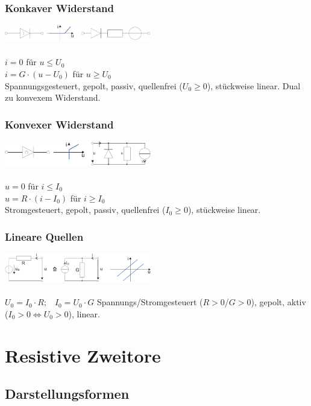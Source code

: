 \documentclass[a4paper,twocolumn,10pt]{article}
\begin{document}
\subsubsection*{Konkaver Widerstand}
\includegraphics[width=0.48\textwidth]{img/Rkonkav}\\\\
$i=0$ für $u\leq U_0$\\
$i=G\cdot (u-U_0)$ für $u\geq U_0$\\
Spannungsgesteuert, gepolt, passiv, quellenfrei ($U_0\ge 0$), stückweise linear. Dual zu konvexem Widerstand.

\subsubsection*{Konvexer Widerstand}
\includegraphics[width=0.48\textwidth]{img/Rkonvex}\\\\
$u=0$ für $i\leq I_0$\\
$u=R\cdot (i-I_0)$ für $i\geq I_0$\\
Stromgesteuert, gepolt, passiv, quellenfrei ($I_0\geq 0$), stückweise linear.

\subsubsection*{Lineare Quellen}
\includegraphics[width=0.48\textwidth]{img/lineareQuellen}\\\\
$U_0=I_0\cdot R;\;\;\;I_0=U_0\cdot G$
Spannungs/Stromgesteuert ($R>0$/$G>0$), gepolt, aktiv ($I_0>0 \Leftrightarrow U_0>0$), linear.

\section*{Resistive Zweitore}
\subsection*{Darstellungsformen}
\end{document}
